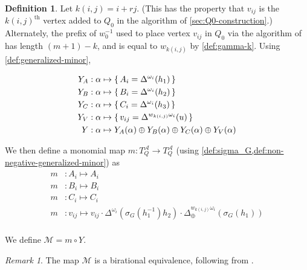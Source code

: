 \documentclass{amsart}
\theoremstyle{plain}
\theoremstyle{definition}
\newtheorem{definition}[theorem]{Definition}
\theoremstyle{remark}
\newtheorem{remark}[theorem]{Remark}
\newcommand{\conftoquiv}{\mathcal{M}}
\newcommand{\fundamentalweight}{\omega}
\newcommand{\genminor}[2]{\Delta^{{#1} \fundamentalweight_{#2}}}
\newcommand{\genminornumerator}[2]{\Delta_{\oplus}^{{#1} {#2}}}
\newcommand{\minorcoordmap}{Y}
\newcommand{\monomialmap}{m}
\newcommand{\seedAtorus}{T^{\mathcal{A}}}
\begin{document}
  \begin{definition}
    \label{def:conf_3_star-to-seed-torus}
    Let $k(i,j) = i + rj$. (This has the property that $v_{ij}$ is the
    $k(i,j)^{\text{th}}$ vertex added to $Q_0$ in the algorithm of
    \cref{sec:Q0-construction}.) Alternately, the prefix of $w_0^{-1}$
    used to place vertex $v_{ij}$ in $Q_0$ via the algorithm of
    \cite[Section~2]{fominzelevinsky2005} has length $(m + 1) - k$, and
    is equal to $w_{k(i,j)}$ by \cref{def:gamma-k}. Using
    \cref{def:generalized-minor},

    \begin{align*}
      \minorcoordmap_{A} &: \alpha \mapsto \set{A_{i} = \genminor{}{i}(h_1)} \\
      \minorcoordmap_{B} &: \alpha \mapsto \set{B_{i} = \genminor{}{i}(h_2)} \\
      \minorcoordmap_{C} &: \alpha \mapsto \set{C_{i} = \genminor{}{i}(h_3)} \\
      \minorcoordmap_{V} &: \alpha \mapsto \set{ v_{ij} = \genminor{w_{k(i,j)}}{i}(u)} \\
      \minorcoordmap &: \alpha \mapsto \minorcoordmap_{A}(\alpha) \oplus \minorcoordmap_{B}(\alpha) \oplus \minorcoordmap_{C}(\alpha) \oplus \minorcoordmap_{V}(\alpha) \\
    \end{align*}

    We then define a monomial map $\monomialmap : \seedAtorus_Q \to
    \seedAtorus_Q$ (using
    \cref{def:sigma_G,def:non-negative-generalized-minor}) as
    \begin{align*}
      \monomialmap &: A_i \mapsto A_i \\
      \monomialmap &: B_i \mapsto B_i \\
      \monomialmap &: C_i \mapsto C_i \\
      \monomialmap &: v_{ij} \mapsto v_{ij} \cdot \genminor{}{i}(\sigma_G(h_1^{-1}) h_2) \cdot \genminornumerator{w_{k(i,j)}}{\fundamentalweight_i}(\sigma_G(h_1)) \\
    \end{align*}

    We define $\conftoquiv = \monomialmap \circ \minorcoordmap$.
  \end{definition}

  \begin{remark}
    \label{rem:M-is-birational-equivalence}
    The map $\conftoquiv$ is a birational equivalence, following from
    \cite[Section~2.7]{fominzelevinsky1999}.
  \end{remark}
\end{document}
